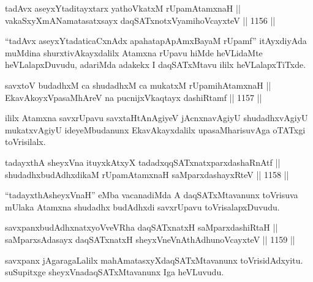 \begin{shl}
tadAvx aseyxYtaditayxtarx yathoVkatxM rUpamAtamxnaH || \\
vakaSxyXmANamatasatxsayx daqSATxnotxV\s yamihoVcayxteV \hfill || 1156 ||  
\end{shl}

\begin{artha}
``tadAvx aseyxYtadaticaCxnAdx apahatapApAmxBayaM rUpamf'' itAyxdiyAda muMdina shurxtivAkayxdalilx Atamxna rUpavu hiMde heVLidaMte heVLalapxDuvudu, adariMda adakekx I daqSATxMtavu ililx heVLalapxTiTxde.
\end{artha}

\begin{shl}
savxtoV budadhxM ca shudadhxM ca mukatxM rUpamihA\s \s tamxnaH || \\
EkavAkoyxVpasaMhAreV na pucnijxVkaqtayx dashiRtamf \hfill || 1157 ||  
\end{shl}

\begin{artha}
ililx Atamxna savxrUpavu savxtaHtAnAgiyeV jAcnxnavAgiyU shudadhxvAgiyU mukatxvAgiyU ideyeMbudanunx EkavAkayxdalilx upasaMharisuvAga oTATxgi toVrisilalx.
\end{artha}


\begin{shl}
tadayxthA sheyxVna ituyxkAtxyX tadadxqqSATxnatxparxdashaRnAtf || \\
shudadhxbudAdhxdikaM rUpamAtamxnaH saMparxdashayxRteV \hfill || 1158 ||  
\end{shl}

\begin{artha}
``tadayxthAsheyxVnaH'' eMba vacanadiMda A daqSATxMtavanunx toVrisuva mUlaka Atamxna shudadhx budAdhxdi savxrUpavu toVrisalapxDuvudu.
\end{artha}


\begin{shl}
savxpanxbudAdhxnatxyoVveVRha daqSATxnatxH saMparxdashiRtaH || \\
saMparxsAdasayx daqSATxnatxH sheyxVneVnAthAdhunoVcayxteV \hfill || 1159 ||  
\end{shl}

\begin{artha}
savxpanx jAgaragaLalilx mahAmatasxyXdaqSATxMtavanunx toVrisidAdxyitu. suSupitxge sheyxVnadaqSATxMtavanunx Iga heVLuvudu.
\end{artha}

